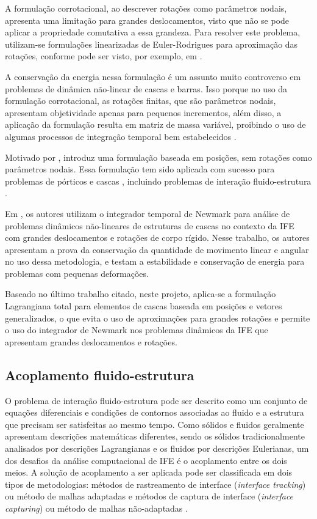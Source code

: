 \documentclass[tese_patricia.tex]{subfiles}
\begin{document}
A formulação corrotacional, ao descrever rotações como parâmetros nodais, apresenta uma limitação para grandes deslocamentos, visto que não se pode aplicar a propriedade comutativa a essa grandeza. Para resolver este problema, utilizam-se formulações linearizadas de Euler-Rodrigues para aproximação das rotações, conforme pode ser visto, por exemplo, em .

A conservação da energia nessa formulação é um assunto muito controverso em problemas de dinâmica não-linear de cascas e barras. Isso porque no uso da formulação corrotacional, as rotações finitas, que são parâmetros nodais, apresentam objetividade apenas para pequenos incrementos, além disso, a aplicação da formulação resulta em matriz de massa variável, proibindo o uso de algumas processos de integração temporal bem estabelecidos \cite{SanchesC:2013}.

Motivado por ,  introduz uma formulação baseada em posições, sem rotações como parâmetros nodais. Essa formulação tem sido aplicada com sucesso para problemas de pórticos e cascas \cite{CodaG:2004,CodaP:2010,CarrazedoC:2010,CodaP:2011,SanchesC:2016}, incluindo problemas de interação fluido-estrutura \cite{SanchesC:2013,SanchesC:2014,FernandesCS:2019,AvanciniS:2020}.

Em , os autores utilizam o integrador temporal de Newmark para análise de problemas dinâmicos não-lineares de estruturas de cascas no contexto da IFE com grandes deslocamentos e rotações de corpo rígido. Nesse trabalho, os autores apresentam a prova da conservação da quantidade de movimento linear e angular no uso dessa metodologia, e testam a estabilidade e conservação de energia para problemas com pequenas deformações. 

Baseado no último trabalho citado, neste projeto, aplica-se a formulação Lagrangiana total para elementos de cascas baseada em posições e vetores generalizados, o que evita o uso de aproximações para grandes rotações e permite o uso do integrador de Newmark nos problemas dinâmicos da IFE que apresentam grandes deslocamentos e rotações.

\subsection{Acoplamento fluido-estrutura}
\label{couplingsection}

O problema de interação fluido-estrutura pode ser descrito como um conjunto de equações diferenciais e condições de contornos associadas ao fluido e a estrutura que precisam ser satisfeitas ao mesmo tempo. Como sólidos e fluidos geralmente apresentam descrições matemáticas diferentes, sendo os sólidos tradicionalmente analisados por descrições Lagrangianas e os fluidos por descrições Eulerianas, um dos desafios da análise computacional de IFE é o acoplamento entre os dois meios. A solução de acoplamento a ser aplicada pode ser classificada em dois tipos de metodologias: métodos de rastreamento de interface (\textit{interface tracking}) ou método de malhas adaptadas e métodos de captura de interface (\textit{interface capturing}) ou método de malhas não-adaptadas \cite{Houetal:2012,BazilevsTT:2013b}.
\end{document}
